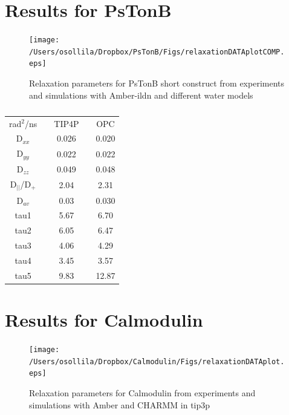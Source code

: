 \documentclass[pre,aps,floatfix,authordate1-4]{revtex4-1}
\begin{document}
\newpage


\section{Results for PsTonB}

\begin{figure}[!h]
  \texttt{[image: /Users/osollila/Dropbox/PsTonB/Figs/relaxationDATAplotCOMP.eps]}%
  \caption{Relaxation parameters for PsTonB short construct from
    experiments and simulations with Amber-ildn and different water models
    \label{hexPHASEdimensionsPLOT}}%
\end{figure}

\begin{table}[htb]
\centering
\caption{
}\label{ROTdiffCOEFFS}
\begin{tabular}{c c c c c}
rad$^2$/ns   &   &        TIP4P    &          &          OPC \\
D$_{xx}$ & &        0.026  & &         0.020 \\
D$_{yy}$  & &         0.022	 & &  0.022 \\
D$_{zz}$   & &       0.049	 & &  0.048 \\
D$_||$/D$_+$   & &   2.04	& &   2.31 \\
D$_{av}$    & &      0.03   & &       0.030 \\
tau1     & &     5.67	 & &         6.70 \\
tau2     & &     6.05	 & &         6.47 \\
tau3     & &     4.06	 & &         4.29 \\
tau4      & &    3.45	 & &         3.57 \\
tau5      & &    9.83	 & &         12.87 \\
\end{tabular}
\end{table}

\section{Results for Calmodulin}

\begin{figure}[!h]
  \texttt{[image: /Users/osollila/Dropbox/Calmodulin/Figs/relaxationDATAplot.eps]}%
  \caption{Relaxation parameters for Calmodulin from
    experiments and simulations with Amber and CHARMM in tip3p
    \label{hexPHASEdimensionsPLOT}}%
\end{figure}
\end{document}

